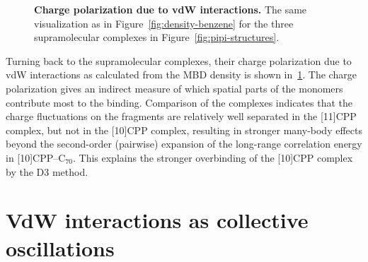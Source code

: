 \begin{figure}
{
}
\caption{\textbf{Charge polarization due to vdW interactions.}
The same visualization as in Figure~\ref{fig:density-benzene} for the three supramolecular complexes in Figure~\ref{fig:pipi-structures}.
}\label{fig:density-supra}
\end{figure}

Turning back to the supramolecular complexes, their charge polarization due to vdW interactions as calculated from the MBD density is shown in~\ref{fig:density-supra}.
The charge polarization gives an indirect measure of which spatial parts of the monomers contribute most to the binding.
Comparison of the complexes indicates that the charge fluctuations on the fragments are relatively well separated in the [11]CPP complex, but not in the [10]CPP complex, resulting in stronger many-body effects beyond the second-order (pairwise) expansion of the long-range correlation energy in [10]CPP--C$_{70}$.
This explains the stronger overbinding of the [10]CPP complex by the D3 method.

\section{VdW interactions as collective oscillations}

